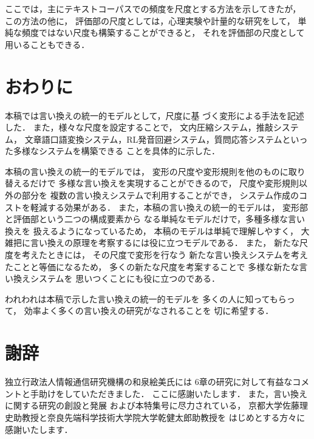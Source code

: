 ここでは，主にテキストコーパスでの頻度を尺度とする方法を示してきたが，
この方法の他に，
評価部の尺度としては，心理実験や計量的な研究をして，
単純な頻度ではない尺度も構築することができると，
それを評価部の尺度として用いることもできる．

\section{おわりに}

本稿では言い換えの統一的モデルとして，尺度に基
づく変形による手法を記述した．
また，様々な尺度を設定することで，
文内圧縮システム，推敲システム，
文章語口語変換システム，RL発音回避システム，質問応答システムといった多様なシステムを構築できる
ことを具体的に示した．

本稿の言い換えの統一的モデルでは，
変形の尺度や変形規則を他のものに取り替えるだけで
多様な言い換えを実現することができるので，
尺度や変形規則以外の部分を
複数の言い換えシステムで利用することができ，
システム作成のコストを軽減する効果がある．
また，本稿の言い換えの統一的モデルは，
変形部と評価部という二つの構成要素から
なる単純なモデルだけで，多種多様な言い換えを
扱えるようになっているため，
本稿のモデルは単純で理解しやすく，
大雑把に言い換えの原理を考察するには役に立つモデルである．
また，
新たな尺度を考えたときには，
その尺度で変形を行なう
新たな言い換えシステムを考えたことと等価になるため，
多くの新たな尺度を考案することで
多様な新たな言い換えシステムを
思いつくことにも役に立つのである．

われわれは本稿で示した言い換えの統一的モデルを
多くの人に知ってもらって，
効率よく多くの言い換えの研究がなされることを
切に希望する．

\section*{謝辞}
独立行政法人情報通信研究機構の和泉絵美氏には
6章の研究に対して有益なコメントと手助けをしていただきました．
ここに感謝いたします．
また，言い換えに関する研究の創設と発展
および本特集号に尽力されている，
京都大学佐藤理史助教授と奈良先端科学技術大学院大学乾健太郎助教授を
はじめとする方々に感謝いたします．


